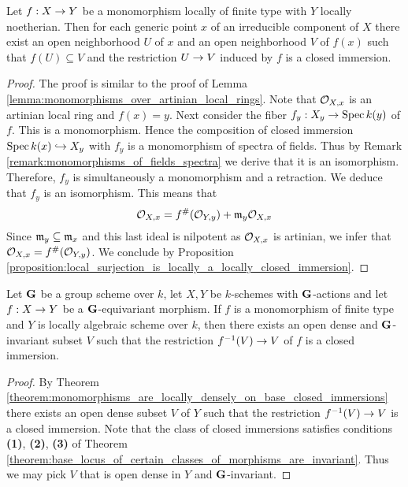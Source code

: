 \begin{theorem}\label{theorem:monomorphisms_are_locally_on_domain_closed_immersions}
Let $f:X\rightarrow Y$ be a monomorphism locally of finite type with $Y$ locally noetherian. Then for each generic point $x$ of an irreducible component of $X$ there exist an open neighborhood $U$ of $x$ and an open neighborhood $V$ of $f(x)$ such that $f(U)\subseteq V$ and the restriction $U\rightarrow V$ induced by $f$ is a closed immersion.
\end{theorem}
\begin{proof}
The proof is similar to the proof of Lemma \ref{lemma:monomorphisms_over_artinian_local_rings}. Note that ${\mathcal O}_{X,x}$ is an artinian local ring and $f(x) = y$. Next consider the fiber $f_y:X_y\rightarrow \mathrm{Spec}\, k(y)$ of $f$. This is a monomorphism. Hence the composition of closed immersion $\mathrm{Spec}\, k(x) \hookrightarrow X_y$ with $f_y$ is a monomorphism of spectra of fields. Thus by Remark \ref{remark:monomorphisms_of_fields_spectra} we derive that it is an isomorphism. Therefore, $f_y$ is simultaneously a monomorphism and a retraction. We deduce that $f_y$ is an isomorphism. This means that
$${\mathcal O}_{X,x} = f^{\#}({\mathcal O}_{Y,y})+\mathfrak{m}_y{\mathcal O}_{X,x}$$
Since $\mathfrak{m}_y\subseteq \mathfrak{m}_x$ and this last ideal is nilpotent as ${\mathcal O}_{X,x}$ is artinian, we infer that ${\mathcal O}_{X,x} = f^{\#}({\mathcal O}_{Y,y})$. We conclude by Proposition \ref{proposition:local_surjection_is_locally_a_locally_closed_immersion}.
\end{proof}

\begin{corollary}\label{corollary:equivariant_monomorphisms_are_local_on_the_base_equivariant_closed_immersion}
Let $\mathbf{G}$ be a group scheme over $k$, let $X,Y$ be $k$-schemes with $\mathbf{G}$-actions and let $f:X\rightarrow Y$ be a $\mathbf{G}$-equivariant morphism. If $f$ is a monomorphism of finite type and $Y$ is locally algebraic scheme over $k$, then there exists an open dense and $\mathbf{G}$-invariant subset $V$ such that the restriction $f^{-1}(V)\rightarrow V$ of $f$ is a closed immersion.
\end{corollary}
\begin{proof}
By Theorem \ref{theorem:monomorphisms_are_locally_densely_on_base_closed_immersions} there exists an open dense subset $V$ of $Y$ such that the restriction $f^{-1}(V)\rightarrow V$ is a closed immersion. Note that the class of closed immersions satisfies conditions \textbf{(1)}, \textbf{(2)}, \textbf{(3)} of Theorem \ref{theorem:base_locus_of_certain_classes_of_morphisms_are_invariant}. Thus we may pick $V$ that is open dense in $Y$ and $\mathbf{G}$-invariant. 
\end{proof}

